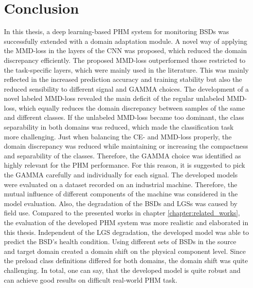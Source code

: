 \chapter{Conclusion}\label{chapter:conclusion}

In this thesis, a deep learning-based PHM system for monitoring BSDs was successfully extended with a domain adaptation module. A novel way of applying the MMD-loss in the layers of the CNN was proposed, which reduced the domain discrepancy efficiently. The proposed MMD-loss outperformed those restricted to the task-specific layers, which were mainly used in the literature. This was mainly reflected in the increased prediction accuracy and training stability but also the reduced sensibility to different signal and GAMMA choices. The development of a novel labeled MMD-loss revealed the main deficit of the regular unlabeled MMD-loss, which equally reduces the domain discrepancy between samples of the same and different classes. If the unlabeled MMD-loss became too dominant, the class separability in both domains was reduced, which made the classification task more challenging. Just when balancing the CE- and MMD-loss properly, the domain discrepancy was reduced while maintaining or increasing the compactness and separability of the classes. Therefore, the GAMMA choice was identified as highly relevant for the PHM performance. For this reason, it is suggested to pick the GAMMA carefully and individually for each signal. The developed models were evaluated on a dataset recorded on an industrial machine. Therefore, the mutual influence of different components of the machine was considered in the model evaluation. Also, the degradation of the BSDs and LGSs was caused by field use. Compared to the presented works in chapter \ref{chapter:related_works}, the evaluation of the developed PHM system was more realistic and elaborated in this thesis. Independent of the LGS degradation, the developed model was able to predict the BSD's health condition. Using different sets of BSDs in the source and target domain created a domain shift on the physical component level. Since the preload class definitions differed for both domains, the domain shift was quite challenging. In total, one can say, that the developed model is quite robust and can achieve good results on difficult real-world PHM task.